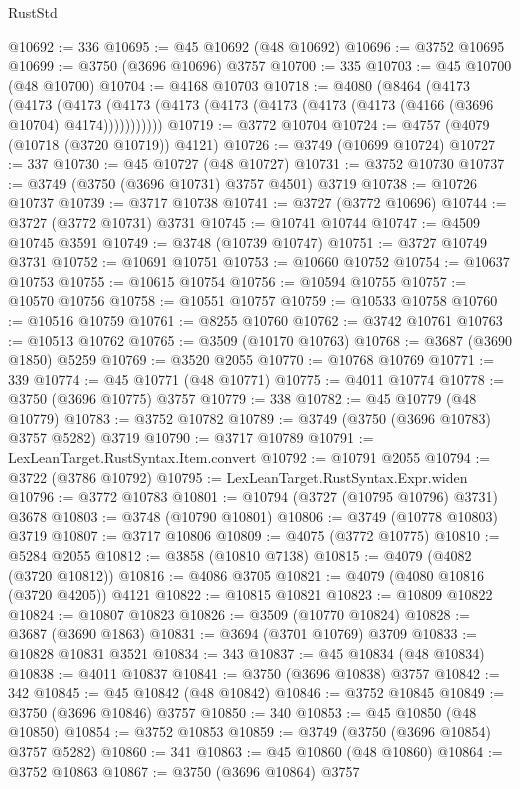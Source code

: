 \begin{lexlean}{RustStd}
\begin{coremodule}
@10692 := 336
@10695 := @45 @10692 (@48 @10692)
@10696 := @3752 @10695
@10699 := @3750 (@3696 @10696) @3757
@10700 := 335
@10703 := @45 @10700 (@48 @10700)
@10704 := @4168 @10703
@10718 := @4080
    (@8464
      (@4173
        (@4173
          (@4173 (@4173 (@4173 (@4173 (@4173 (@4173 (@4173 (@4166 (@3696 @10704) @4174)))))))))))
@10719 := @3772 @10704
@10724 := @4757 (@4079 (@10718 (@3720 @10719)) @4121)
@10726 := @3749 (@10699 @10724)
@10727 := 337
@10730 := @45 @10727 (@48 @10727)
@10731 := @3752 @10730
@10737 := @3749 (@3750 (@3696 @10731) @3757 @4501) @3719
@10738 := @10726 @10737
@10739 := @3717 @10738
@10741 := @3727 (@3772 @10696)
@10744 := @3727 (@3772 @10731) @3731
@10745 := @10741 @10744
@10747 := @4509 @10745 @3591
@10749 := @3748 (@10739 @10747)
@10751 := @3727 @10749 @3731
@10752 := @10691 @10751
@10753 := @10660 @10752
@10754 := @10637 @10753
@10755 := @10615 @10754
@10756 := @10594 @10755
@10757 := @10570 @10756
@10758 := @10551 @10757
@10759 := @10533 @10758
@10760 := @10516 @10759
@10761 := @8255 @10760
@10762 := @3742 @10761
@10763 := @10513 @10762
@10765 := @3509 (@10170 @10763)
@10768 := @3687 (@3690 @1850) @5259
@10769 := @3520 @2055
@10770 := @10768 @10769
@10771 := 339
@10774 := @45 @10771 (@48 @10771)
@10775 := @4011 @10774
@10778 := @3750 (@3696 @10775) @3757
@10779 := 338
@10782 := @45 @10779 (@48 @10779)
@10783 := @3752 @10782
@10789 := @3749 (@3750 (@3696 @10783) @3757 @5282) @3719
@10790 := @3717 @10789
@10791 := LexLeanTarget.RustSyntax.Item.convert
@10792 := @10791 @2055
@10794 := @3722 (@3786 @10792)
@10795 := LexLeanTarget.RustSyntax.Expr.widen
@10796 := @3772 @10783
@10801 := @10794 (@3727 (@10795 @10796) @3731) @3678
@10803 := @3748 (@10790 @10801)
@10806 := @3749 (@10778 @10803) @3719
@10807 := @3717 @10806
@10809 := @4075 (@3772 @10775)
@10810 := @5284 @2055
@10812 := @3858 (@10810 @7138)
@10815 := @4079 (@4082 (@3720 @10812))
@10816 := @4086 @3705
@10821 := @4079 (@4080 @10816 (@3720 @4205)) @4121
@10822 := @10815 @10821
@10823 := @10809 @10822
@10824 := @10807 @10823
@10826 := @3509 (@10770 @10824)
@10828 := @3687 (@3690 @1863)
@10831 := @3694 (@3701 @10769) @3709
@10833 := @10828 @10831 @3521
@10834 := 343
@10837 := @45 @10834 (@48 @10834)
@10838 := @4011 @10837
@10841 := @3750 (@3696 @10838) @3757
@10842 := 342
@10845 := @45 @10842 (@48 @10842)
@10846 := @3752 @10845
@10849 := @3750 (@3696 @10846) @3757
@10850 := 340
@10853 := @45 @10850 (@48 @10850)
@10854 := @3752 @10853
@10859 := @3749 (@3750 (@3696 @10854) @3757 @5282)
@10860 := 341
@10863 := @45 @10860 (@48 @10860)
@10864 := @3752 @10863
@10867 := @3750 (@3696 @10864) @3757

\end{coremodule}
\end{lexlean}
